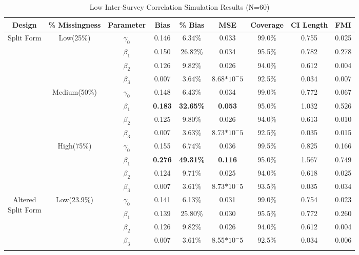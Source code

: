 \documentclass{svjour3}                     %
\begin{document}
\begin{table}[p]
	\centering
	\caption{Low Inter-Survey Correlation Simulation Results (N=60)}
	\label{tab:table5}
	\setlength{\tabcolsep}{0.1cm}
	\hspace*{-1cm}
	\begin{tabular}{c|c|c|cccccc}
		\toprule
		Design & \% Missingness & Parameter & Bias & \% Bias & MSE & Coverage & CI Length & FMI \\
		\midrule
		\multirow{12}{*}{Split Form}
		& \multirow{4}{*}{Low(25\%)}
		& $\gamma_0$ & 0.146 & 6.34\% & 0.033 & 99.0\% & 0.755 & 0.025 \\
		&& $\beta_1$ & 0.150 & 26.82\% & 0.034 & 95.5\% & 0.782 & 0.278 \\
		&& $\beta_2$ & 0.126 & 9.82\% & 0.026 & 94.0\% & 0.612 & 0.004 \\
		&& $\beta_3$ & 0.007 & 3.64\% & 8.68$*10^-5$ & 92.5\% & 0.034 & 0.007 \\ \cline{2-9} \noalign{\smallskip}
		&\multirow{4}{*}{Medium(50\%)}
		& $\gamma_0$ & 0.148 & 6.43\% & 0.034 & 99.0\% & 0.772 & 0.067 \\
		&& $\beta_1$ & \textbf{0.183} & \textbf{32.65\%} & \textbf{0.053} & 95.0\% & 1.032 & 0.526 \\
		&& $\beta_2$ & 0.125 & 9.80\% & 0.026 & 94.0\% & 0.613 & 0.010 \\
		&& $\beta_3$ & 0.007 & 3.63\% & 8.73$*10^-5$ & 92.5\% & 0.035 & 0.015 \\ \cline{2-9} \noalign{\smallskip}
		& \multirow{4}{*}{High(75\%)}
		& $\gamma_0$ & 0.155 & 6.74\% & 0.036 & 99.5\% & 0.825 & 0.166 \\
		&& $\beta_1$ & \textbf{0.276} & \textbf{49.31\%} & \textbf{0.116} & 95.0\% & 1.567 & 0.749 \\
		&& $\beta_2$ & 0.124 & 9.71\% & 0.025 & 94.0\% & 0.618 & 0.025 \\
		&& $\beta_3$ & 0.007 & 3.61\% & 8.73$*10^-5$ & 93.5\% & 0.035 & 0.034 \\
		\midrule
		\midrule
		\multirow{12}{*}{\parbox{1.75cm}{Altered \\ Split Form}}
		& \multirow{4}{*}{Low(23.9\%)}
		& $\gamma_0$ & 0.141 & 6.13\% & 0.031 & 99.0\% & 0.754 & 0.023 \\
		&& $\beta_1$ & 0.139 & 25.80\% & 0.030 & 95.5\% & 0.772 & 0.260 \\
		&& $\beta_2$ & 0.126 & 9.82\% & 0.026 & 94.0\% & 0.612 & 0.004 \\
		&& $\beta_3$ & 0.007 & 3.61\% & 8.55$*10^-5$ & 92.5\% & 0.034 & 0.006 \\ \cline{2-9} \noalign{\smallskip}

\end{tabular}
\end{table}
\end{document}
